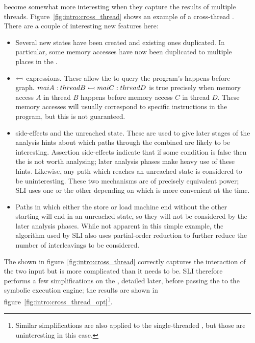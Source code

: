 \STateMachines become somewhat more interesting when they capture the
results of multiple threads.  Figure~\ref{fig:intro:cross_thread}
shows an example of a cross-thread \StateMachine.  There are a couple
of interesting new features here:

\begin{itemize}
\item Several new states have been created and existing ones
  duplicated.  In particular, some memory accesses have now been
  duplicated to multiple places in the \StateMachine.
\item
  $\leftarrowtail$ expressions.  These allow the \StateMachine to
  query the program's happens-before graph.  $maiA:threadB
  \leftarrowtail maiC:threadD$ is true precisely when memory access
  $A$ in thread $B$ happens before memory access $C$ in thread $D$.
  These memory accesses will usually correspond to specific
  instructions in the program, but this is not guaranteed.
\item
   side-effects and the unreached state.  These are used to
  give later stages of the analysis hints about which paths through
  the combined \StateMachine are likely to be interesting.  Assertion
  side-effects indicate that if some condition is false then the
  \StateMachine is not worth analysing; later analysis phases make
  heavy use of these hints.  Likewise, any path which reaches an
  unreached state is considered to be uninteresting.  These two
  mechanisms are of precisely equivalent power; SLI uses one or the
  other depending on which is more convenient at the time.
\item
  Paths in which either the store or load machine end without the
  other starting will end in an unreached state, so they will not be
  considered by the later analysis phases.  While not apparent in this
  simple example, the algorithm used by SLI also uses partial-order
  reduction\needCite{} to further reduce the number of interleavings
  to be considered.
\end{itemize}

The \StateMachine shown in figure~\ref{fig:intro:cross_thread}
correctly captures the interaction of the two input \StateMachines but
is more complicated than it needs to be.  SLI therefore performs a few
simplifications on the \StateMachine, detailed later, before passing
the \StateMachine to the symbolic execution engine; the results are
shown in figure~\ref{fig:intro:cross_thread_opt}\footnote{Similar
  simplifications are also applied to the single-threaded
  \StateMachines, but those are uninteresting in this case.}.


